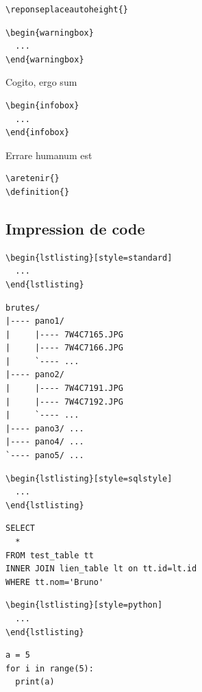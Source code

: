 \begin{verbatim}
\reponseplaceautoheight{}
\end{verbatim}

\begin{verbatim}
\begin{warningbox}
  ...
\end{warningbox}
\end{verbatim}
\begin{warningbox}
  Cogito, ergo sum 
\end{warningbox}

\begin{verbatim}
\begin{infobox}
  ...
\end{infobox}
\end{verbatim}
\begin{infobox}[Linux]
  Errare humanum est
\end{infobox}


\begin{verbatim}
\aretenir{}
\definition{}
\end{verbatim}
\subsection{Impression de code}
\begin{verbatim}
\begin{lstlisting}[style=standard]
  ...
\end{lstlisting}
\end{verbatim}
\begin{lstlisting}[style=standard]
brutes/
|---- pano1/
|     |---- 7W4C7165.JPG
|     |---- 7W4C7166.JPG
|     `---- ...
|---- pano2/
|     |---- 7W4C7191.JPG
|     |---- 7W4C7192.JPG
|     `---- ...
|---- pano3/ ...
|---- pano4/ ...
`---- pano5/ ...
\end{lstlisting}

\begin{verbatim}
\begin{lstlisting}[style=sqlstyle]
  ...
\end{lstlisting}
\end{verbatim}
\begin{lstlisting}[style=sqlstyle]
SELECT 
  *
FROM test_table tt 
INNER JOIN lien_table lt on tt.id=lt.id
WHERE tt.nom='Bruno'
\end{lstlisting}
\begin{verbatim}
\begin{lstlisting}[style=python]
  ...
\end{lstlisting}
\end{verbatim}
\begin{lstlisting}[style=python]
a = 5
for i in range(5):
  print(a)
\end{lstlisting}

